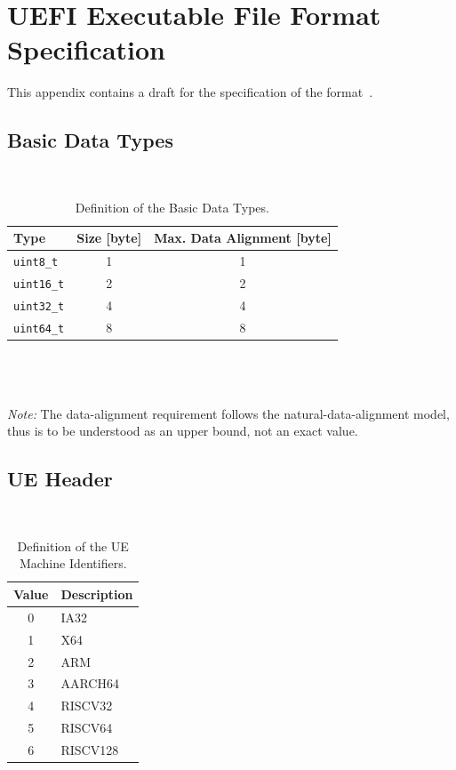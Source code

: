 \FloatBarrier
\chapter{UEFI Executable File Format Specification}

This appendix contains a draft for the specification of the  format~\cite{thesis-git}.

\FloatBarrier
\section{Basic Data Types}

\begin{table}[!htb]
  \centering
  \caption{Definition of the Basic Data Types.}
  \hfill\\
  \begin{tabular}{l c c}
    \toprule
    \textbf{Type} & \textbf{Size} [\gls{byte}] & \textbf{Max. Data Alignment} [\gls{byte}]\\
    \midrule
    \lstinline|uint8_t| & 1 & 1\\
    \lstinline|uint16_t| & 2 & 2\\
    \lstinline|uint32_t| & 4 & 4\\
    \lstinline|uint64_t| & 8 & 8\\
    \bottomrule
  \end{tabular}\\
  \hfill\\
  \hfill\\
  \emph{Note:} The \gls{data-alignment} requirement follows the \gls{natural-data-alignment} model, thus is to be understood as an upper bound, not an exact value.
\end{table}

\FloatBarrier
\section{UE Header}

\begin{table}[!htb]
  \centering
  \caption{Definition of the UE Machine Identifiers.}
  \hfill\\
  \begin{tabular}{c l}
    \toprule
    \textbf{Value} & \textbf{Description}\\
    \midrule
    0 & IA32\\
    1 & X64\\
    2 & ARM\\
    3 & AARCH64\\
    4 & RISCV32\\
    5 & RISCV64\\
    6 & RISCV128\\
    \bottomrule
  \end{tabular}
\end{table}

